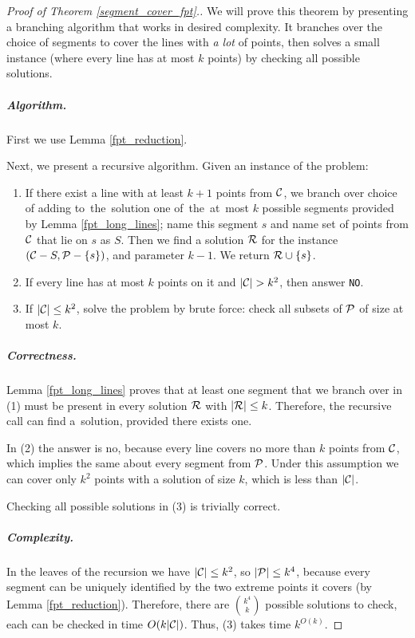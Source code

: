\begin{proof}[Proof of Theorem \ref{segment_cover_fpt}.]\leavevmode

We will prove this theorem by presenting a branching algorithm that
works in desired complexity. It branches over the
choice of segments to cover the lines with \textit{a lot} of points,
then solves a small instance (where every line has at most $k$ points)
by checking all possible solutions.

\subparagraph{Algorithm.}
First we use Lemma \ref{fpt_reduction}.

Next, we present a recursive algorithm. Given an instance of the problem:

\begin{enumerate}[label={(\arabic*)}]
\item If there exist a line with at least $k+1$ points from $\mathcal{C}$,
we branch over choice of adding to~the~solution one of~the~at~most $k$ possible segments
provided by Lemma \ref{fpt_long_lines}; name this segment $s$
and name set of points from $\mathcal{C}$ that lie on $s$ as $S$.
Then we find a solution $\mathcal{R}$
for the instance $(\mathcal{C} - S, \mathcal{P} - \{s\})$,
and parameter $k-1$. We return $\mathcal{R} \cup \{s\}$.
\item If every line has at most $k$ points on it and $|\mathcal{C}| > k^2$,
then answer \texttt{NO}.
\item If $|\mathcal{C}| \le k^2$, solve the problem by brute force:
check all subsets of $\mathcal{P}$ of size at most $k$.
\end{enumerate}

\subparagraph{Correctness.}

Lemma \ref{fpt_long_lines} proves that at least one segment that we
branch over in (1) must be present in every solution $\mathcal{R}$ with $|\mathcal{R}| \le k$.
Therefore, the recursive call can find a~solution, provided there exists one.

In (2) the answer is no, because every line covers no more than $k$ points
from $\mathcal{C}$, which implies the same about every segment from $\mathcal{P}$.
Under this assumption
we can cover only $k^2$ points with a solution of size $k$, which is less
than $|\mathcal{C}|$.

Checking all possible solutions in (3) is trivially correct.


\subparagraph{Complexity.}

In the leaves of the recursion we have $|\mathcal{C}| \le k^2$, so $|\mathcal{P}| \le k^4$,
because every segment can be uniquely identified by the two extreme points it covers
(by Lemma \ref{fpt_reduction}). Therefore, there are $\binom{k^4}{k}$
possible solutions to check, each can be checked in time $O(k|\mathcal{C}|)$.
Thus, (3) takes time $k^{O(k)}$.



\end{proof}
